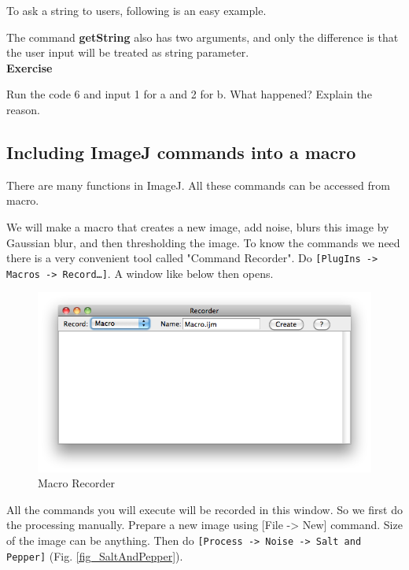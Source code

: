 \documentclass[11pt,a4paper,oneside]{report}
\newenvironment{indentexercise}[1]%
{{\setlength{\leftmargin}{2em}}%
\textbf{Exercise \thesubsection-#1}%
\begin{list}{}%
	\item%
}
{\end{list}}
\newcommand{\ijmenu}[1]{\texttt{\small#1}}
\begin{document}
To ask a string to users, following is an easy example. 


The command \textbf{getString} also has two arguments, and only the difference is that the user input will be treated as string parameter. \\

\begin{indentexercise}{1}
Run the code 6 and input 1 for a and 2 for b. What happened? Explain the reason. 
\end{indentexercise}

\subsection{Including ImageJ commands into a macro}
There are many functions in ImageJ. All these commands can be accessed from macro. 

We will make a macro that creates a new image, add noise,  blurs this image by Gaussian blur, 
and then thresholding the image. To know the commands we need there is a very convenient tool called 
"Command Recorder". 
Do \ijmenu{[PlugIns -> Macros -> Record\ldots]}. A window like below then opens. 

\begin{figure}[htbp]
\begin{center}
\includegraphics[scale=0.6]{fig/MacroRecorderBlank.png}
\caption{Macro Recorder} \label{fig_macroRecorderBlank}
\end{center}
\end{figure}

All the commands you will execute will be recorded in this window. 
So we first do the processing manually. 
Prepare a new image using [File -> New] command. 
Size of the image can be anything. 
Then do \ijmenu{[Process -> Noise -> Salt and Pepper]} (Fig. \ref{fig_SaltAndPepper}).
\end{document}
